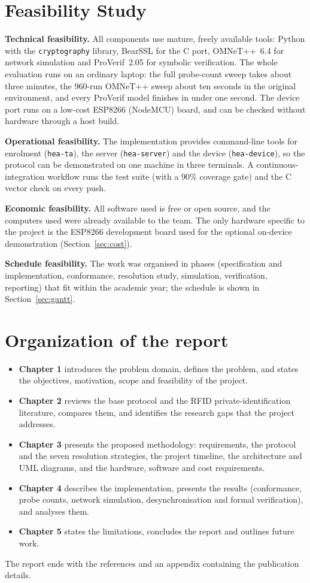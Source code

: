 \section{Feasibility Study}
\textbf{Technical feasibility.} All components use mature, freely available tools: Python with the \texttt{cryptography} library, BearSSL for the C port, OMNeT++~6.4 for network simulation and ProVerif~2.05 for symbolic verification. The whole evaluation runs on an ordinary laptop: the full probe-count sweep takes about three minutes, the 960-run OMNeT++ sweep about ten seconds in the original environment, and every ProVerif model finishes in under one second. The device port runs on a low-cost ESP8266 (NodeMCU) board, and can be checked without hardware through a host build.

\textbf{Operational feasibility.} The implementation provides command-line tools for enrolment (\texttt{hea-ta}), the server (\texttt{hea-server}) and the device (\texttt{hea-device}), so the protocol can be demonstrated on one machine in three terminals. A continuous-integration workflow runs the test suite (with a 90\% coverage gate) and the C vector check on every push.

\textbf{Economic feasibility.} All software used is free or open source, and the computers used were already available to the team. The only hardware specific to the project is the ESP8266 development board used for the optional on-device demonstration (Section~\ref{sec:cost}).

\textbf{Schedule feasibility.} The work was organised in phases (specification and implementation, conformance, resolution study, simulation, verification, reporting) that fit within the academic year; the schedule is shown in Section~\ref{sec:gantt}.

\section{Organization of the report}
\begin{itemize}
\item \textbf{Chapter 1} introduces the problem domain, defines the problem, and states the objectives, motivation, scope and feasibility of the project.
\item \textbf{Chapter 2} reviews the base protocol and the RFID private-identification literature, compares them, and identifies the research gaps that the project addresses.
\item \textbf{Chapter 3} presents the proposed methodology: requirements, the protocol and the seven resolution strategies, the project timeline, the architecture and UML diagrams, and the hardware, software and cost requirements.
\item \textbf{Chapter 4} describes the implementation, presents the results (conformance, probe counts, network simulation, desynchronisation and formal verification), and analyses them.
\item \textbf{Chapter 5} states the limitations, concludes the report and outlines future work.
\end{itemize}
The report ends with the references and an appendix containing the publication details.

